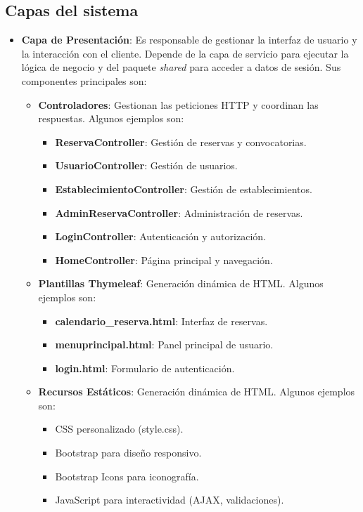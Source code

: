 \subsection{Capas del sistema}
\begin{itemize}
	\item \textbf{Capa de Presentación}: Es responsable de gestionar la interfaz de usuario y la interacción con el cliente. Depende de la capa de servicio para ejecutar la lógica de negocio y del paquete \emph{shared} para acceder a datos de sesión. Sus componentes principales son:
    	\begin{itemize}
            \item \textbf{Controladores}: Gestionan las peticiones HTTP y coordinan las respuestas. Algunos ejemplos son:
        	\begin{itemize}
                \item \textbf{ReservaController}: Gestión de reservas y convocatorias.
                \item \textbf{UsuarioController}: Gestión de usuarios.
                \item \textbf{EstablecimientoController}: Gestión de establecimientos.
                \item \textbf{AdminReservaController}: Administración de reservas.
                \item \textbf{LoginController}: Autenticación y autorización.
                \item \textbf{HomeController}: Página principal y navegación.
             \end{itemize}

            \item \textbf{Plantillas Thymeleaf}: Generación dinámica de HTML. Algunos ejemplos son:
            \begin{itemize}
               \item \textbf{calendario\_reserva.html}: Interfaz de reservas.
               \item \textbf{menuprincipal.html}: Panel principal de usuario.
               \item \textbf{login.html}: Formulario de autenticación.
            \end{itemize}

            \item \textbf{Recursos Estáticos}: Generación dinámica de HTML. Algunos ejemplos son:
            \begin{itemize}
               \item CSS personalizado (style.css).
               \item Bootstrap para diseño responsivo.
               \item Bootstrap Icons para iconografía.
               \item JavaScript para interactividad (AJAX, validaciones).
            \end{itemize}


\end{itemize}
\end{itemize}
